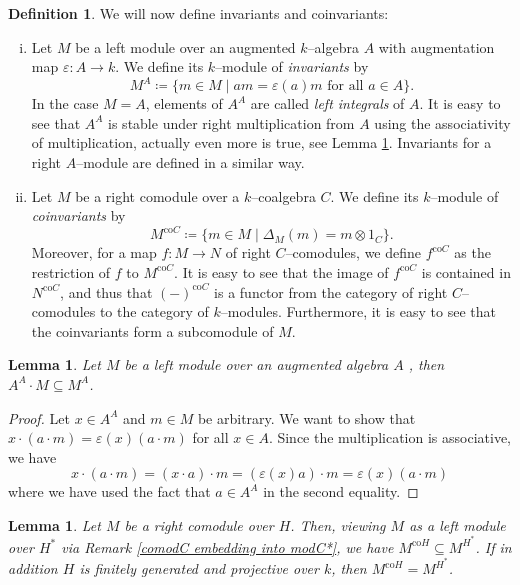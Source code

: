 \documentclass{article}
\theoremstyle{plain}
\newtheorem{Lemma}[Th]{Lemma}
\theoremstyle{definition}
\newtheorem{Def}[Th]{Definition}
\begin{document}
\begin{Def}\label{def:coinvariants}
We will now define invariants and coinvariants:
\begin{enumerate}[(i)]
    \item Let $M$ be a left module over an augmented $k$--algebra $A$ with augmentation map $\varepsilon\colon A\to k$. We define its $k$--module of \textit{invariants} by 
    \[
    M^A\coloneqq\{m\in M\mid am=\varepsilon(a)m \text{ for all }a\in A\}.
    \]
    In the case $M=A$, elements of $A^A$ are called \textit{left integrals} of $A$. It is easy to see that $A^A$ is stable under right multiplication from $A$ using the associativity of multiplication, actually even more is true, see Lemma \ref{right mult}. Invariants for a right $A$--module are defined in a similar way. 

    
    \item    Let $M$ be a right comodule over a $k$--coalgebra $C$. We define its $k$--module of \textit{coinvariants} by 
    \[
    M^{\text{co}C}\coloneqq \{m\in M \mid \Delta_M(m)=m\otimes 1_C\}.
    \]
    Moreover, for a map $f\colon M\to N$ of right $C$--comodules, we define $f^{\text{co}C}$ as the restriction of $f$ to $M^{\text{co}C}$. It is easy to see that the image of $f^{\text{co}C}$ is contained in $N^{\text{co}C}$, and thus that $(-)^{\text{co}C}$ is a functor from the category of right $C$--comodules to the category of $k$--modules. Furthermore, it is easy to see that the coinvariants form a subcomodule of $M$.
\end{enumerate}
\end{Def}


\begin{Lemma}\label{right mult}
    Let $M$ be a left module over an augmented algebra $A$ , then $A^A \cdot M \subseteq M^{A}$.
\end{Lemma}

\begin{proof}
Let $x\in A^A$ and $m\in M$ be arbitrary. We want to show that $x \cdot (a \cdot m)=\varepsilon(x)(a\cdot m)$ for all $x\in A$. Since the multiplication is associative, we have 
\[
x \cdot (a \cdot m)=(x \cdot a) \cdot m = (\varepsilon(x)a)\cdot m = \varepsilon(x)(a\cdot m)
\]
where we have used the fact that $a\in A^A$ in the second equality.
\end{proof}

\begin{Lemma}\label{invariants and coinvariants} Let $M$ be a right comodule over $H$. Then, viewing $M$ as a left module over $H^*$ via Remark \ref{comodC embedding into modC*}, we have $M^{\text{co}H}\subseteq M^{H^*}$. If in addition $H$ is finitely generated and projective over $k$, then $M^{\text{co}H}= M^{H^*}$.
\end{Lemma}
\end{document}
